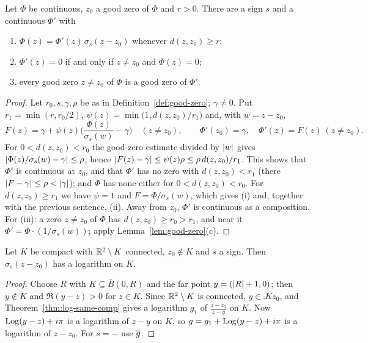 
\begin{lemma}\label{lem:remove-zero}
Let $\Phi$ be continuous, $z_0$ a good zero of $\Phi$ and $r>0$. There are a sign $s$ and a
continuous $\Phi'$ with
\begin{enumerate}[label=(\roman*)]
\item $\Phi(z)=\Phi'(z)\,\sigma_s(z-z_0)$ whenever $d(z,z_0)\ge r$;
\item $\Phi'(z)=0$ if and only if $z\neq z_0$ and $\Phi(z)=0$;
\item every good zero $z\neq z_0$ of $\Phi$ is a good zero of $\Phi'$.
\end{enumerate}
\end{lemma}

\begin{proof}
Let $r_0,s,\gamma,\rho$ be as in Definition~\ref{def:good-zero}; $\gamma\neq0$. Put
$r_1=\min(r,r_0/2)$, $\psi(z)=\min\big(1,d(z,z_0)/r_1\big)$ and, with $w=z-z_0$,
\[
F(z)=\gamma+\psi(z)\Big(\frac{\Phi(z)}{\sigma_s(w)}-\gamma\Big)\quad(z\neq z_0),\qquad
\Phi'(z_0)=\gamma,\quad\Phi'(z)=F(z)\ (z\neq z_0).
\]
For $0<d(z,z_0)<r_0$ the good-zero estimate divided by $\left\lvert w\right\rvert$ gives
$\left\lvert \Phi(z)/\sigma_s(w)-\gamma\right\rvert\le\rho$, hence $\left\lvert F(z)-\gamma\right\rvert\le\psi(z)\rho\le\rho\, d(z,z_0)/r_1$.
This shows that $\Phi'$ is continuous at $z_0$, and that $\Phi'$ has no zero with
$d(z,z_0)<r_1$ (there $\left\lvert F-\gamma\right\rvert\le\rho<\left\lvert \gamma\right\rvert$); and $\Phi$ has none either for
$0<d(z,z_0)<r_0$. For $d(z,z_0)\ge r_1$ we have $\psi=1$ and $F=\Phi/\sigma_s(w)$, which gives (i) and,
together with the previous sentence, (ii). Away from $z_0$, $\Phi'$ is continuous as a composition.
For (iii): a zero $z\neq z_0$ of $\Phi$ has $d(z,z_0)\ge r_0>r_1$, and near it
$\Phi'=\Phi\cdot(1/\sigma_s(w))$; apply Lemma~\ref{lem:good-zero}(c).
\end{proof}


\begin{lemma}\label{lem:log-factor}
Let $K$ be compact with $\mathbb{R}^2\setminus K$ connected, $z_0\notin K$ and $s$ a sign. Then
$\sigma_s(z-z_0)$ has a logarithm on $K$.
\end{lemma}

\begin{proof}
Choose $R$ with $K\subseteq\bar B(0,R)$ and the far point $y=(\left\lvert R\right\rvert+1,0)$; then $y\notin K$ and
$\Re(y-z)>0$ for $z\in K$. Since $\mathbb{R}^2\setminus K$ is connected, $y\in\comp K{z_0}$, and
Theorem~\ref{thm:log-same-comp} gives a logarithm $g_1$ of $\frac{z-z_0}{z-y}$ on $K$. Now
$\operatorname{Log}(y-z)+i\pi$ is a logarithm of $z-y$ on $K$, so $g=g_1+\operatorname{Log}(y-z)+i\pi$ is a logarithm of $z-z_0$.
For $s=-$ use $\overline{g}$.
\end{proof}


